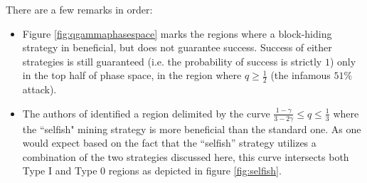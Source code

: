 \documentclass[letterpaper,12pt]{report}
\begin{document}
There are a few remarks in order:
\begin{itemize}
\item Figure \ref{fig:qgammaphasespace} marks the regions where a block-hiding strategy in beneficial, but does not guarantee success. Success of either strategies is still guaranteed (i.e. the probability of success is strictly $1$) only in the top half of phase space, in the region where $q\geq \frac{1}{2}$ (the infamous $51\%$ attack).
\item The authors of \cite{Selfish} identified a region delimited by the curve $\frac{1-\gamma}{3-2\gamma}\leq q \leq \frac{1}{3}$ where the ``selfish" mining strategy is more beneficial than the standard one. As one would expect based on the fact that the ``selfish'' strategy utilizes a combination of the two strategies discussed here, this curve intersects both Type I and Type 0 regions as depicted in figure \ref{fig:selfish}.
\end{itemize}

\noindent%
\begin{minipage}{\linewidth}
\label{fig:selfish}
\end{minipage}
\linebreak
\end{document}
